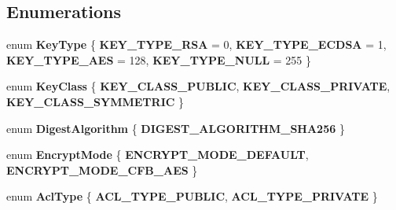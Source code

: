 \subsection*{Enumerations}
\begin{DoxyCompactItemize}
\item 
enum {\bfseries Key\+Type} \{ {\bfseries K\+E\+Y\+\_\+\+T\+Y\+P\+E\+\_\+\+R\+SA} = 0, 
{\bfseries K\+E\+Y\+\_\+\+T\+Y\+P\+E\+\_\+\+E\+C\+D\+SA} = 1, 
{\bfseries K\+E\+Y\+\_\+\+T\+Y\+P\+E\+\_\+\+A\+ES} = 128, 
{\bfseries K\+E\+Y\+\_\+\+T\+Y\+P\+E\+\_\+\+N\+U\+LL} = 255
 \}\hypertarget{namespacendn_a530a68e62e202a0316dce1ca57e33ba4}{}\label{namespacendn_a530a68e62e202a0316dce1ca57e33ba4}

\item 
enum {\bfseries Key\+Class} \{ {\bfseries K\+E\+Y\+\_\+\+C\+L\+A\+S\+S\+\_\+\+P\+U\+B\+L\+IC}, 
{\bfseries K\+E\+Y\+\_\+\+C\+L\+A\+S\+S\+\_\+\+P\+R\+I\+V\+A\+TE}, 
{\bfseries K\+E\+Y\+\_\+\+C\+L\+A\+S\+S\+\_\+\+S\+Y\+M\+M\+E\+T\+R\+IC}
 \}\hypertarget{namespacendn_ae6151f64a9129419c682f5f061e45872}{}\label{namespacendn_ae6151f64a9129419c682f5f061e45872}

\item 
enum {\bfseries Digest\+Algorithm} \{ {\bfseries D\+I\+G\+E\+S\+T\+\_\+\+A\+L\+G\+O\+R\+I\+T\+H\+M\+\_\+\+S\+H\+A256}
 \}\hypertarget{namespacendn_ade6652cb977738dab1a71575b9348885}{}\label{namespacendn_ade6652cb977738dab1a71575b9348885}

\item 
enum {\bfseries Encrypt\+Mode} \{ {\bfseries E\+N\+C\+R\+Y\+P\+T\+\_\+\+M\+O\+D\+E\+\_\+\+D\+E\+F\+A\+U\+LT}, 
{\bfseries E\+N\+C\+R\+Y\+P\+T\+\_\+\+M\+O\+D\+E\+\_\+\+C\+F\+B\+\_\+\+A\+ES}
 \}\hypertarget{namespacendn_a48e94b252bc944dc0b32981ec530fd69}{}\label{namespacendn_a48e94b252bc944dc0b32981ec530fd69}

\item 
enum {\bfseries Acl\+Type} \{ {\bfseries A\+C\+L\+\_\+\+T\+Y\+P\+E\+\_\+\+P\+U\+B\+L\+IC}, 
{\bfseries A\+C\+L\+\_\+\+T\+Y\+P\+E\+\_\+\+P\+R\+I\+V\+A\+TE}
 \}\hypertarget{namespacendn_a6b1fd5cadc3bfd96b07d793ef5344075}{}\label{namespacendn_a6b1fd5cadc3bfd96b07d793ef5344075}

\end{DoxyCompactItemize}

